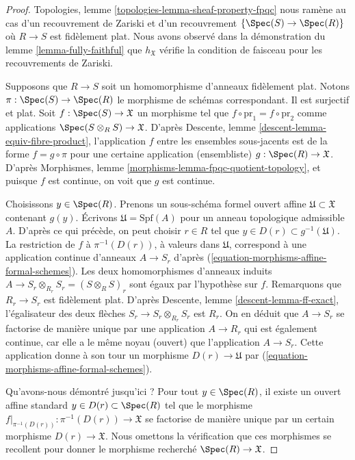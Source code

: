 \begin{proof}
Topologies, lemme \ref{topologies-lemma-sheaf-property-fpqc}
nous ramène au cas d'un recouvrement de Zariski et d'un recouvrement
$\{\Spec(S) \to \Spec(R)\}$ où $R \to S$ est fidèlement plat.
Nous avons observé dans la démonstration du lemme \ref{lemma-fully-faithful} 
que $h_\mathfrak X$ vérifie la condition de faisceau pour les recouvrements de Zariski.

\medskip\noindent
Supposons que $R \to S$ soit un homomorphisme d'anneaux fidèlement plat.
Notons $\pi : \Spec(S) \to \Spec(R)$ le
morphisme de schémas correspondant. Il est surjectif et plat.
Soit $f : \Spec(S) \to \mathfrak X$ un morphisme
tel que $f \circ \text{pr}_1 = f \circ \text{pr}_2$
comme applications $\Spec(S \otimes_R S) \to \mathfrak X$.
D'après Descente, lemme \ref{descent-lemma-equiv-fibre-product},
l'application $f$ entre les ensembles sous-jacents
est de la forme $f = g \circ \pi$ pour une certaine
application (ensembliste) $g : \Spec(R) \to \mathfrak X$.
D'après Morphismes, lemme \ref{morphisms-lemma-fpqc-quotient-topology},
et puisque $f$ est continue, on voit que $g$
est continue.

\medskip\noindent
Choisissons $y \in \Spec(R)$. Prenons un sous-schéma formel ouvert affine
$\mathfrak U \subset \mathfrak X$ contenant $g(y)$.
Écrivons $\mathfrak U = \text{Spf}(A)$ pour un anneau topologique
admissible $A$. D'après ce qui précède, on peut choisir $r \in R$ tel que
$y \in D(r) \subset g^{-1}(\mathfrak U)$.
La restriction de $f$ à $\pi^{-1}(D(r))$, à valeurs dans $\mathfrak U$,
correspond à une application continue d'anneaux $A \to S_r$ d'après
(\ref{equation-morphisms-affine-formal-schemes}). Les deux homomorphismes d'anneaux induits
$A \to S_r \otimes_{R_r} S_r = (S \otimes_R S)_r$ sont égaux
par l'hypothèse sur $f$.
Remarquons que $R_r \to S_r$ est fidèlement plat.
D'après Descente, lemme \ref{descent-lemma-ff-exact}, l'égalisateur des
deux flèches $S_r \to S_r \otimes_{R_r} S_r$ est $R_r$.
On en déduit que $A \to S_r$ se factorise de manière unique par une application $A \to R_r$
qui est également continue, car elle a le même noyau (ouvert) que
l'application $A \to S_r$. Cette application donne à son tour un morphisme $D(r) \to \mathfrak U$ par
(\ref{equation-morphisms-affine-formal-schemes}).

\medskip\noindent
Qu'avons-nous démontré jusqu'ici ? Pour tout $y \in \Spec(R)$,
il existe un ouvert affine standard
$y \in D(r) \subset \Spec(R)$ tel que le morphisme
$f|_{\pi^{-1}(D(r))} : \pi^{-1}(D(r)) \to \mathfrak X$ se factorise de manière unique
par un certain morphisme $D(r) \to \mathfrak X$. Nous omettons la
vérification que ces morphismes se recollent pour donner le
morphisme recherché $\Spec(R) \to \mathfrak X$.
\end{proof}


